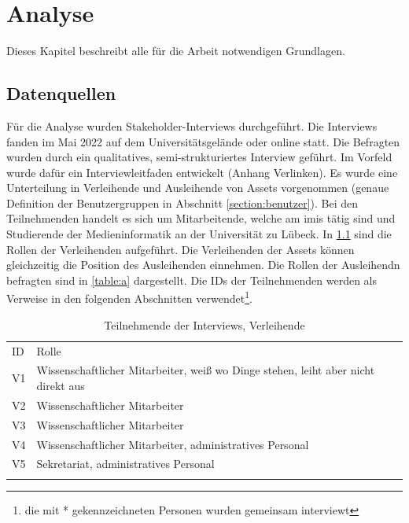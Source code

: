 
\chapter{Analyse}
\label{chapter-analyse}

Dieses Kapitel beschreibt alle für die Arbeit notwendigen Grundlagen.

\section{Datenquellen}
\label{section:daten}
Für die Analyse wurden Stakeholder-Interviews durchgeführt. Die Interviews
fanden im Mai 2022 auf dem Universitätsgelände oder online statt. Die Befragten
wurden durch ein qualitatives, semi-strukturiertes Interview geführt. Im Vorfeld
wurde dafür ein Interviewleitfaden entwickelt (Anhang Verlinken). Es wurde eine
Unterteilung in Verleihende und Ausleihende von Assets vorgenommen (genaue
Definition der Benutzergruppen in Abschnitt \ref{section:benutzer}). Bei den
Teilnehmenden handelt es sich um Mitarbeitende, welche am \ac{imis} tätig sind
und Studierende der Medieninformatik an der Universität zu Lübeck. In
\ref{table:v} sind die Rollen der Verleihenden aufgeführt. Die Verleihenden der
Assets können gleichzeitig die Position des Ausleihenden einnehmen. Die Rollen
der Ausleihendn befragten sind in \ref{table:a} dargestellt. Die IDs der
Teilnehmenden werden als Verweise in den folgenden Abschnitten
verwendet\footnote{die mit * gekennzeichneten Personen wurden gemeinsam
        interviewt}.


\begin{table}[h]
        \centering
        \caption{Teilnehmende der Interviews, Verleihende}
        \begin{tabular}{ll}
                \arrayrulecolor{maincolor}\hline
                \sffamily\color{maincolor}ID & \sffamily\color{maincolor}Rolle
                \\
                \arrayrulecolor{maincolor}\hline
                V1                           & Wissenschaftlicher Mitarbeiter,
                weiß wo Dinge stehen, leiht aber nicht direkt aus              \\
                V2                           & Wissenschaftlicher Mitarbeiter  \\
                V3                           & Wissenschaftlicher Mitarbeiter  \\
                V4                           & Wissenschaftlicher Mitarbeiter,
                administratives Personal                                       \\
                V5                           & Sekretariat, administratives
                Personal                                                       \\
                \arrayrulecolor{maincolor}\hline
        \end{tabular}
        \label{table:v}
\end{table}

